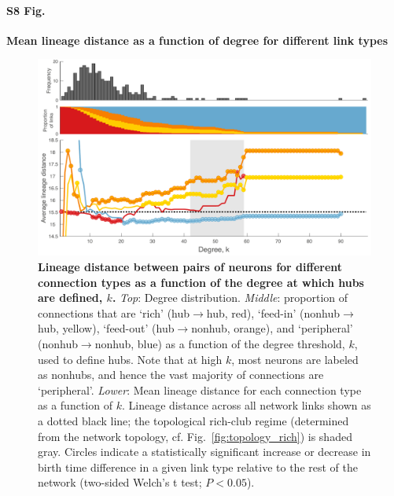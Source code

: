 \documentclass[10pt,letterpaper]{article}
\begin{document}
\paragraph*{S8 Fig.}
{\bf Mean lineage distance as a function of degree for different link types}
\begin{figure}[!h]

\centering
    \includegraphics[width=1\textwidth]{Lineage.pdf}
    \caption{
    \textbf{Lineage distance between pairs of neurons for different connection types as a function of the degree at which hubs are defined, $k$.}
    \emph{Top}: Degree distribution.
\emph{Middle}: proportion of connections that are `rich' (hub$\rightarrow$hub, red), `feed-in' (nonhub$\rightarrow$hub, yellow), `feed-out' (hub$\rightarrow$nonhub, orange), and `peripheral' (nonhub$\rightarrow$nonhub, blue) as a function of the degree threshold, $k$, used to define hubs.
Note that at high $k$, most neurons are labeled as nonhubs, and hence the vast majority of connections are `peripheral'.
\emph{Lower}: Mean lineage distance for each connection type as a function of $k$.
Lineage distance across all network links shown as a dotted black line; the topological rich-club regime (determined from the network topology, cf. Fig.~\ref{fig:topology_rich}) is shaded gray.
Circles indicate a statistically significant increase or decrease in birth time difference in a given link type relative to the rest of the network (two-sided Welch’s t test; $P < 0.05$).
}
\label{fig:Lineagek}
\end{figure}
\end{document}
